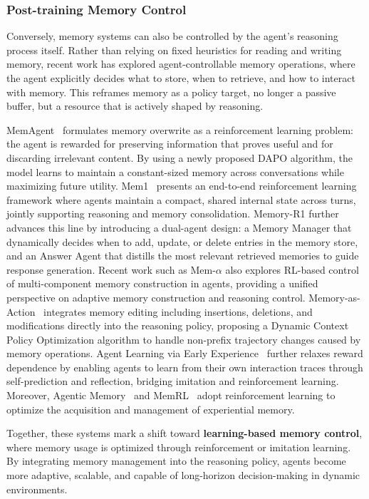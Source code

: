\subsubsection{Post-training Memory Control}
Conversely, memory systems can also be controlled by the agent's reasoning process itself. Rather than relying on fixed heuristics for reading and writing memory, recent work has explored agent-controllable memory operations, where the agent explicitly decides what to store, when to retrieve, and how to interact with memory. This reframes memory as a policy target, no longer a passive buffer, but a resource that is actively shaped by reasoning.

MemAgent~\cite{yu2025memagent} formulates memory overwrite as a reinforcement learning problem: the agent is rewarded for preserving information that proves useful and for discarding irrelevant content. By using a newly proposed DAPO algorithm, the model learns to maintain a constant-sized memory across conversations while maximizing future utility. Mem1~\cite{zhou2025mem1} presents an end-to-end reinforcement learning framework where agents maintain a compact, shared internal state across turns, jointly supporting reasoning and memory consolidation. Memory-R1 \cite{yan2025memoryr1} further advances this line by introducing a dual-agent design: a Memory Manager that dynamically decides when to add, update, or delete entries in the memory store, and an Answer Agent that distills the most relevant retrieved memories to guide response generation. Recent work such as Mem-$\alpha$ \cite{wang2025mem1} also explores RL-based control of multi-component memory construction in agents, providing a unified perspective on adaptive memory construction and reasoning control. Memory-as-Action~\cite{zhang2025memory} integrates memory editing including insertions, deletions, and modifications directly into the reasoning policy, proposing a Dynamic Context Policy Optimization algorithm to handle non-prefix trajectory changes caused by memory operations. Agent Learning via Early Experience~\cite{zhang2025agent2} further relaxes reward dependence by enabling agents to learn from their own interaction traces through self-prediction and reflection, bridging imitation and reinforcement learning. Moreover, Agentic Memory~\cite{yu2026agentic} and MemRL~\cite{zhang2026memrl} adopt reinforcement learning to optimize the acquisition and management of experiential memory.


Together, these systems mark a shift toward \textbf{learning-based memory control}, where memory usage is optimized through reinforcement or imitation learning. By integrating memory management into the reasoning policy, agents become more adaptive, scalable, and capable of long-horizon decision-making in dynamic environments.






